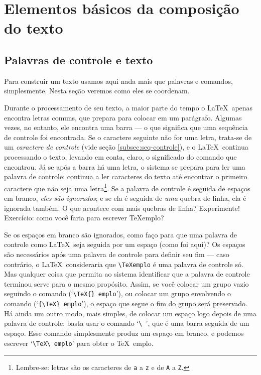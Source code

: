 \section{Elementos básicos da composição do texto}

\subsection{Palavras de controle e texto}\label{sec:palavras-de-controle}

Para construir um texto usamos aqui nada mais que palavras e comandos,
simplesmente. Nesta seção veremos como eles se coordenam.

Durante o processamento de seu texto, a maior parte do tempo o
\LaTeX\ apenas encontra letras comuns, que prepara para colocar em um
parágrafo. Algumas vezes, no entanto, ele encontra uma barra --- o que
significa que uma sequência de controle foi encontrada. Se o caractere
seguinte não for uma letra, trata-se de um 
\emph{caractere de controle} (vide seção \ref{subsec:seq-controle}), e
o \LaTeX\ continua processando o texto, levando em conta, claro, o
significado do comando que encontrou. Já se após a barra há uma
letra, o sistema se prepara para ler uma palavra de controle: continua
a ler caracteres do texto até encontrar o primeiro caractere que não
seja uma letra\footnote{Lembre-se: letras são os caracteres de
  \texttt{a} a \texttt{z} e de \texttt{A} a \texttt{Z}.}. Se a palavra
de controle é seguida de espaços em branco, \emph{eles são
  ignorados}; e se ela é seguida de \emph{uma} quebra de linha, ela é
ignorada também. O que acontece com mais quebras de linha?
Experimente! Exercício: como você faria para escrever \TeX emplo?

Se os espaços em branco são ignorados, como faço para que uma palavra
de controle como \LaTeX\ seja seguida por um espaço (como foi aqui)?
Os espaços são necessários após uma palavra de controle para definir
seu fim --- caso contrário, o \LaTeX\ consideraria que \verb'\TeXemplo' é
uma palavra de controle só. Mas qualquer coisa que permita ao sistema
identificar que a palavra de controle terminou serve para o mesmo
propósito. Assim, se você colocar um grupo vazio seguindo o comando
(`\verb'\TeX{} emplo''), ou colocar um grupo envolvendo o comando
(`\verb'{\TeX} emplo''), o espaço que segue o fim do grupo será
preservado. Há ainda um outro modo, mais simples, de colocar um espaço
logo depois de uma palavra de controle: basta usar o comando
`\verb'\ '', que é uma barra seguida de um espaço. Esse comando
simplesmente produz um espaço em branco, e podemos escrever
`\verb'\TeX\ emplo'' para obter o \TeX\ emplo.

